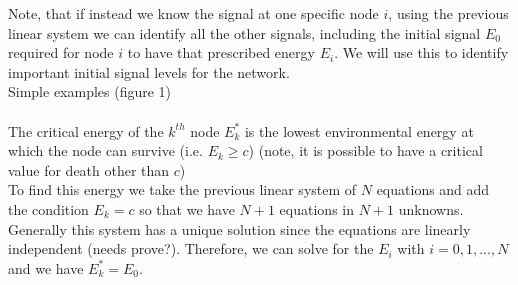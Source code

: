 \documentclass{amsart}
\theoremstyle{plain}
\numberwithin{equation}{section}
\begin{document}
Note, that if instead we know the signal at one specific node $i$, using the previous linear system we can identify all the other signals, including the initial signal $E_0$ required for node $i$ to have that prescribed energy $E_i$. We will use this to identify important initial signal levels for the network.
\\
Simple examples (figure 1)\\
	\\
	The critical energy of the $k^{th}$ node $E^*_k$ is the lowest environmental energy at which the node can survive (i.e. $E_k \geq c$) (note, it is possible to have a critical value for death other than $c$)\\
To find this energy we take the previous linear system of $N$ equations and add the condition $E_k=c$ so that we have $N+1$ equations in $N+1$ unknowns. Generally this system has a unique solution since the equations are linearly independent (needs prove?). Therefore, we can solve for the $E_i$ with $i=0,1,...,N$ and we have $E^*_k=E_0$.\\
\end{document}
